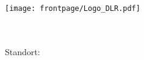 \begin{titlepage}
{\begin{framed}
{{			\parbox{2cm}{
				\texttt{[image: frontpage/Logo\_DLR.pdf]}
			}
									
			\hspace{0.9cm}
											
			\parbox{5cm}{	
				\small{
					\dlr\\\\
					Standort: \standort
				}			
			}
					
			\hspace{0.1cm}
										
			\parbox{5,5cm}{								
				\small{
					\institut\\
					\abteilung\\\\
					\betreuer
				}			
			}
		}
		
	}\end{framed}
}\end{titlepage}